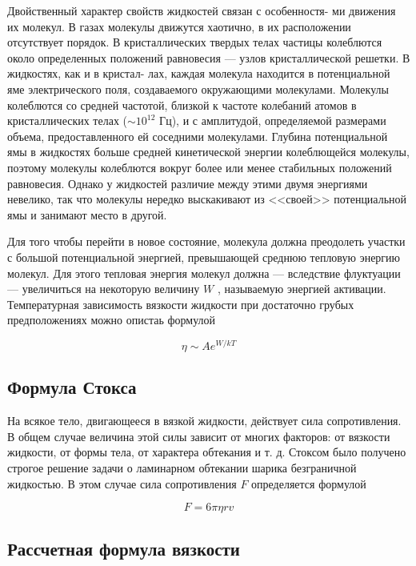 \documentclass[a4paper,12pt]{article} %
\begin{document}
\noindent Двойственный характер свойств жидкостей связан с особенностя- ми движения их молекул. В газах молекулы движутся хаотично, в их расположении отсутствует порядок. В кристаллических твердых телах частицы колеблются около определенных положений равновесия — узлов кристаллической решетки. В жидкостях, как и в кристал- лах, каждая молекула находится в потенциальной яме электрического поля, создаваемого окружающими молекулами. Молекулы колеблются со средней частотой, близкой к частоте колебаний атомов в кристаллических телах ($\sim 10^{12}$ Гц), и с амплитудой, определяемой размерами объема, предоставленного ей соседними молекулами. Глубина потенциальной ямы в жидкостях больше средней кинетической энергии колеблющейся молекулы, поэтому молекулы колеблются вокруг более или менее стабильных положений равновесия. Однако у жидкостей различие между этими двумя энергиями невелико, так что молекулы нередко выскакивают из <<своей>> потенциальной ямы и занимают место в другой.

\medskip
	
\noindent Для того чтобы перейти в новое состояние, молекула должна преодолеть участки с большой потенциальной энергией, превышающей среднюю тепловую энергию молекул. Для этого тепловая энергия молекул должна — вследствие флуктуации — увеличиться на некоторую величину $W$ , называемую энергией активации. Температурная зависимость вязкости жидкости при достаточно грубых предположениях можно опистаь формулой

	\begin{equation}
		\eta \sim A e^{W/kT}
	\end{equation}
	
\subsection{Формула Стокса}
	
\noindent На всякое тело, двигающееся в вязкой жидкости, действует сила сопротивления. В общем случае величина этой силы зависит от многих факторов: от вязкости жидкости, от формы тела, от характера обтекания и т. д. Стоксом было получено строгое решение задачи о ламинарном обтекании шарика безграничной жидкостью. В этом случае сила сопротивления $F$ определяется формулой

	\begin{equation}
		F = 6\pi \eta r v
	\end{equation}
	
\subsection{Рассчетная формула вязкости}
	
\end{document}
